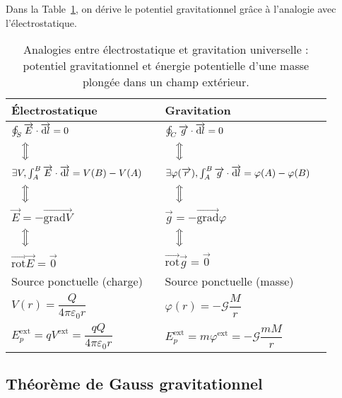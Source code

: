     Dans la Table~\ref{tab:analogie_gravitation_universelle_potentiel_gravitationnel}, on dérive le potentiel gravitationnel grâce à l'analogie avec l'électrostatique.
    \begin{table}
        \centering
        \begin{tabular}{p{0.45\linewidth}|p{0.45\linewidth}}
            \toprule
            Électrostatique & Gravitation \\ \midrule
            $\oint_{S}\protect\overrightarrow{{E}}\cdot\protect\overrightarrow{{\mathrm{d} l}}=0$ & $\oint_{C}\protect\overrightarrow{{g}}\cdot\protect\overrightarrow{{\mathrm{d} l}}=0$\\[0.25cm]
            $\quad\Big\Updownarrow$&$\quad\Big\Updownarrow$\\[0.25cm]
            $\exists V, \int_{A}^{B}\protect\overrightarrow{{E}}\cdot\protect\overrightarrow{{\mathrm{d} l}}=V(B)-V(A)$ & $\exists \varphi(\protect\overrightarrow{{r}}),\int_{A}^{B}\protect\overrightarrow{{g}}\cdot\protect\overrightarrow{{\mathrm{d} l}}=\varphi(A)-\varphi(B)$\\[0.25cm]
            $\quad\Big\Updownarrow$&$\quad\Big\Updownarrow$\\[0.25cm]
            $\vec{E}=-\vec{\mathrm{grad}V}$ & $\vec{g}=-\vec{\mathrm{grad}}\varphi$\\[0.25cm]
            $\quad\Big\Updownarrow$&$\quad\Big\Updownarrow$\\[0.25cm]
            $\vec{\mathrm{rot}}\vec{E}=\vec{0}$ & $\vec{\mathrm{rot}}\vec{g}=\vec{0}$\\ \midrule
            Source ponctuelle (charge) & Source ponctuelle (masse)\\ \midrule
            $V(r)=\dfrac{Q}{4\pi\varepsilon_0 r}$ & $\varphi(r)=-\mathcal{G}\dfrac{M}{r}$\\ \midrule
            $E_{p}^{\text{ext}}=qV^{\text{ext}}=\dfrac{qQ}{4\pi\varepsilon_0 r}$ & $E_p^{\text{ext}}=m\varphi^{\text{ext}}=-\mathcal{G}\dfrac{mM}{r}$\\
            \bottomrule
        \end{tabular}    
        \caption{Analogies entre électrostatique et gravitation universelle : potentiel gravitationnel et énergie potentielle d'une masse plongée dans un champ extérieur.}
        \label{tab:analogie_gravitation_universelle_potentiel_gravitationnel}
    \end{table}

    \subsection{Théorème de Gauss gravitationnel}

